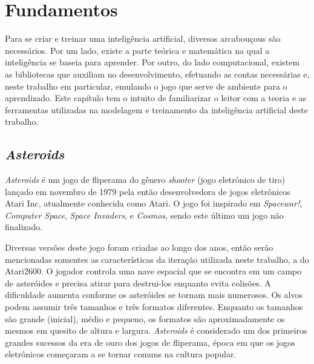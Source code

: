 \chapter{Fundamentos}
\label{cap:fundamentos}

Para se criar e treinar uma inteligência artificial, diversos arcabouçous são necessários. Por um lado, existe a parte teórica e matemática na qual a inteligência se baseia para aprender. Por outro, do lado computacional, existem as bibliotecas que auxiliam no desenvolvimento, efetuando as contas necessárias e, neste trabalho em particular, emulando o jogo que serve de ambiente para o aprendizado.
Este capítulo tem o intuito de familiarizar o leitor com a teoria e as ferramentas utilizadas na modelagem e treinamento da inteligência artificial deste trabalho.

\section{\textit{Asteroids}}
\label{sec:asteroids}

\textit{Asteroids} é um jogo de fliperama do gênero \textit{shooter} (jogo eletrônico de tiro) lançado em novembro de 1979 pela então desenvolvedora de jogos eletrônicos Atari Inc, atualmente conhecida como Atari. O jogo foi inspirado em \textit{Spacewar!}, \textit{Computer Space}, \textit{Space Invaders}, e \textit{Cosmos}, sendo este último um jogo não finalizado.

Diversas versões deste jogo foram criadas ao longo dos anos, então serão mencionadas somentes as características da iteração utilizada neste trabalho, a do Atari2600.
O jogador controla uma nave espacial que se encontra em um campo de asteróides e precisa atirar para destrui-los enquanto evita colisões. A dificuldade aumenta conforme os asteróides se tornam mais numerosos. Os alvos podem assumir três tamanhos e três formatos diferentes. Enquanto os tamanhos são grande (inicial), médio e pequeno, os formatos são aproximadamente os mesmos em quesito de altura e largura.
\textit{Asteroids} é considerado um dos primeiros grandes sucessos da era de ouro dos jogos de fliperama, época em que os jogos eletrônicos começaram a se tornar comuns na cultura popular. 

